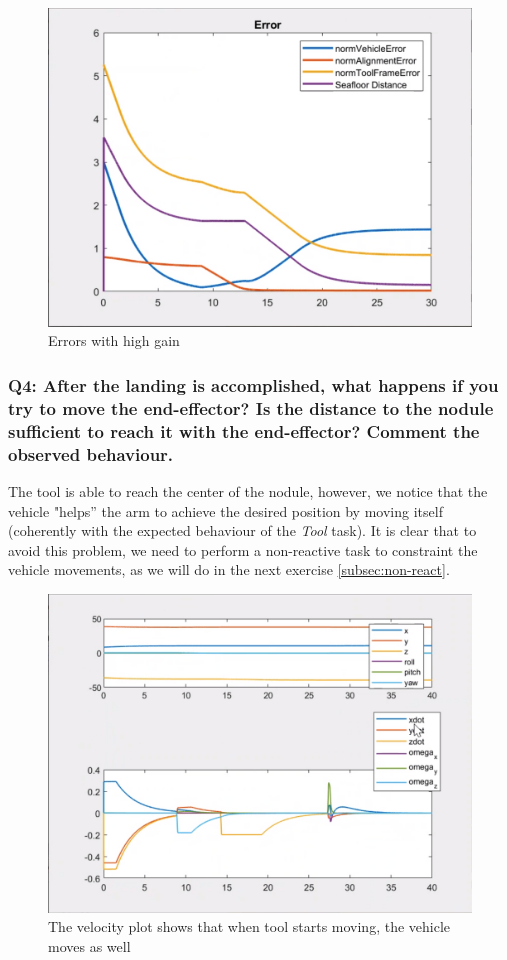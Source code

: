 \documentclass{article}
\begin{document}
\begin{figure}[htpb]
\begin{minipage}{0.40\textwidth}
\includegraphics[width=\textwidth]{313_b_Errors.png}
\caption{Errors with high gain}\label{err_w_b} 
\end{minipage}
\end{figure}

\clearpage 
\subsubsection{Q4: After the landing is accomplished, what happens if you try to move the end-effector? Is the distance to the nodule sufficient to reach it with the end-effector? Comment the observed behaviour.}\label{ex3}
The tool is able to reach the center of the nodule, however, we notice that the vehicle "helps'' the arm to achieve the desired position by moving itself (coherently with the expected behaviour of the \textit{Tool} task). It is clear that to avoid this problem, we need to perform a non-reactive task to constraint the vehicle movements, as we will do in the next exercise \ref{subsec:non-react}. 

\begin{figure}[h]
    \centering
    \includegraphics[scale=0.4]{314_ppdot.png}
    \caption{The velocity plot shows that when tool starts moving, the vehicle moves as well}
    \label{graphes3}
\end{figure}
\end{document}
